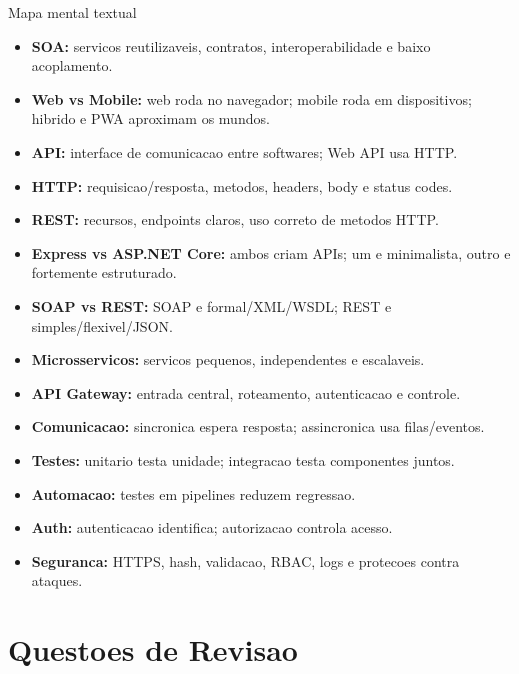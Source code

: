 \documentclass[12pt,a4paper]{article}
\begin{document}
\begin{conceito}{Mapa mental textual}
\begin{itemize}
  \item \textbf{SOA:} servicos reutilizaveis, contratos, interoperabilidade e baixo acoplamento.
  \item \textbf{Web vs Mobile:} web roda no navegador; mobile roda em dispositivos; hibrido e PWA aproximam os mundos.
  \item \textbf{API:} interface de comunicacao entre softwares; Web API usa HTTP.
  \item \textbf{HTTP:} requisicao/resposta, metodos, headers, body e status codes.
  \item \textbf{REST:} recursos, endpoints claros, uso correto de metodos HTTP.
  \item \textbf{Express vs ASP.NET Core:} ambos criam APIs; um e minimalista, outro e fortemente estruturado.
  \item \textbf{SOAP vs REST:} SOAP e formal/XML/WSDL; REST e simples/flexivel/JSON.
  \item \textbf{Microsservicos:} servicos pequenos, independentes e escalaveis.
  \item \textbf{API Gateway:} entrada central, roteamento, autenticacao e controle.
  \item \textbf{Comunicacao:} sincronica espera resposta; assincronica usa filas/eventos.
  \item \textbf{Testes:} unitario testa unidade; integracao testa componentes juntos.
  \item \textbf{Automacao:} testes em pipelines reduzem regressao.
  \item \textbf{Auth:} autenticacao identifica; autorizacao controla acesso.
  \item \textbf{Seguranca:} HTTPS, hash, validacao, RBAC, logs e protecoes contra ataques.
\end{itemize}
\end{conceito}

\section{Questoes de Revisao}
\end{document}
